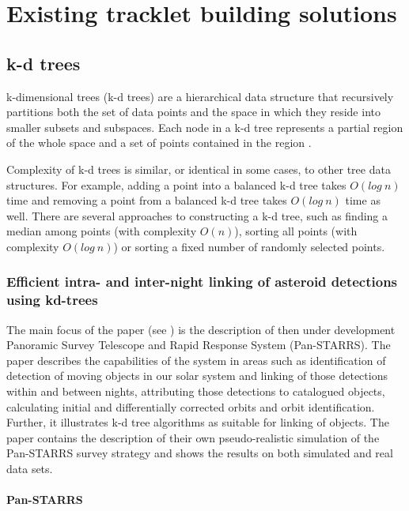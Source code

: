 \chapter{Existing tracklet building solutions}\label{chap:existing_solutions}

\section{k-d trees}\label{sec:kd_trees}
	
	k-dimensional trees (k-d trees) are a hierarchical data structure that recursively partitions both the set of data points and the space in which they reside into smaller subsets and subspaces. Each node in a k-d tree represents a partial region of the whole space and a set of points contained in the region \citep{Bentley:1975:MBS:361002.361007}.
	
	Complexity of k-d trees is similar, or identical in some cases, to other tree data structures. For example, adding a point into a balanced k-d tree takes $O(log\ n)$ time and removing a point from a balanced k-d tree takes $O(log\ n)$ time as well. There are several approaches to constructing a k-d tree, such as finding a median among points (with complexity $O(n)$), sorting all points (with complexity $O(log\ n)$) or sorting a fixed number of randomly selected points.

\subsection{Efficient intra- and inter-night linking of asteroid detections using kd-trees}\label{subsec:intra_inter}

	The main focus of the paper (see \citep{kubica}) is the description of then under development Panoramic Survey Telescope and Rapid Response System (Pan-STARRS). The paper describes the capabilities of the system in areas such as identification of detection of moving objects in our solar system and linking of those detections within and between nights, attributing those detections to catalogued objects, calculating initial and differentially corrected orbits and orbit identification. Further, it illustrates k-d tree algorithms as suitable for linking of objects. The paper contains the description of their own pseudo-realistic simulation of the Pan-STARRS survey strategy and shows the results on both simulated and real data sets.
	
\subsubsection{Pan-STARRS}
	
